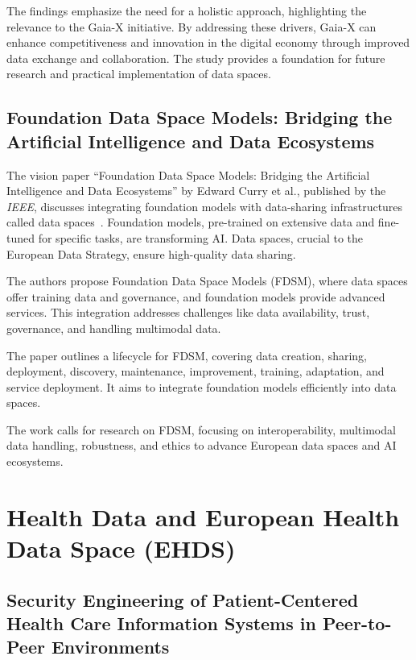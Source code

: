 The findings emphasize the need for a holistic approach, highlighting the relevance to the Gaia-X initiative.
By addressing these drivers, Gaia-X can enhance competitiveness and innovation in the digital economy through improved data exchange and collaboration.
The study provides a foundation for future research and practical implementation of data spaces.

\subsection[Foundation Data Space Models]{Foundation Data Space Models: Bridging the Artificial Intelligence and Data Ecosystems}\label{subsec:foundation-data-space-models:-bridging-the-artificial-intelligence-and-data-ecosystems}

The vision paper ``Foundation Data Space Models: Bridging the Artificial Intelligence and Data Ecosystems'' by Edward Curry et al., published by the \textit{IEEE}, discusses integrating foundation models with data-sharing infrastructures called data spaces~\cite{foundation_data_space_models}.
Foundation models, pre-trained on extensive data and fine-tuned for specific tasks, are transforming AI. Data spaces, crucial to the European Data Strategy, ensure high-quality data sharing.

The authors propose Foundation Data Space Models (FDSM), where data spaces offer training data and governance, and foundation models provide advanced services.
This integration addresses challenges like data availability, trust, governance, and handling multimodal data.

The paper outlines a lifecycle for FDSM, covering data creation, sharing, deployment, discovery, maintenance, improvement, training, adaptation, and service deployment.
It aims to integrate foundation models efficiently into data spaces.

The work calls for research on FDSM, focusing on interoperability, multimodal data handling, robustness, and ethics to advance European data spaces and AI ecosystems.

\section{Health Data and European Health Data Space (EHDS)}\label{sec:health-data-and-european-health-data-space}

\subsection[Security of Patient-centered Health Care Systems in P2P Environment]{Security Engineering of Patient-Centered Health Care Information Systems in Peer-to-Peer Environments}\label{subsec:security-engineering-of-patient-centered-health-care-information-systems-in-peer-to-peer-environments}

